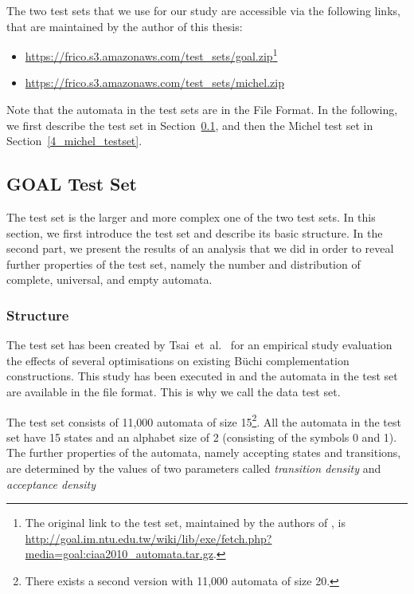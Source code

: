 The two test sets that we use for our study are accessible via the following links, that are maintained by the author of this thesis:

\begin{itemize}
\item \url{https://frico.s3.amazonaws.com/test_sets/goal.zip}\footnote{The original link to the \goal{} test set, maintained by the authors of \goal, is \url{http://goal.im.ntu.edu.tw/wiki/lib/exe/fetch.php?media=goal:ciaa2010_automata.tar.gz}.}
\item \url{https://frico.s3.amazonaws.com/test_sets/michel.zip}
\end{itemize}

Note that the automata in the test sets are in the \goal{} File Format. In the following, we first describe the \goal{} test set in Section~\ref{4_goal_testset}, and then the Michel test set in Section~\ref{4_michel_testset}.

\subsection{GOAL Test Set}
\label{4_goal_testset}
The \goal{} test set is the larger and more complex one of the two test sets. In this section, we first introduce the \goal{} test set and describe its basic structure. In the second part, we present the results of an analysis that we did in order to reveal further properties of the \goal{} test set, namely the number and distribution of complete, universal, and empty automata.

\subsubsection{Structure}
The \goal{} test set has been created by Tsai~et~al.~\cite{2011_tsai} for an empirical study evaluation the effects of several optimisations on existing Büchi complementation constructions. This study has been executed in \goal{} and the automata in the test set are available in the \goal{} file format. This is why we call the data \goal{} test set.

The \goal{} test set consists of 11,000 automata of size 15\footnote{There exists a second version with 11,000 automata of size 20.}. All the automata in the test set have 15 states and an alphabet size of 2 (consisting of the symbols 0 and 1). The further properties of the automata, namely accepting states and transitions, are determined by the values of two parameters called \textit{transition density} and \textit{acceptance density}

